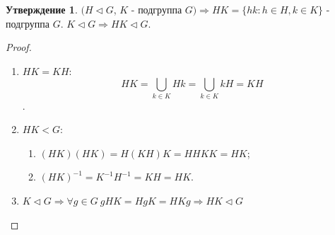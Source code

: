\documentclass[11pt,a4paper]{report}
\renewcommand{\implies}{\Rightarrow}
\newcommand{\tl}{\triangleleft}
\theoremstyle{definition}
\theoremstyle{definition}
\newtheorem{preposition}{Утверждение}[section]
\theoremstyle{definition}
\begin{document}
\begin{preposition}
  \label{normal_and_sub_prep}
  $(H \tl G$, $K$ - подгруппа $G) \implies HK = \{ hk : h \in H, k \in K \}$ - подгруппа $G$. $K \tl G \implies HK \tl G$.
\begin{proof}
\begin{enumerate}
\item{$HK = KH$:$$HK = \bigcup_{k \in K} Hk =
  \bigcup_{k \in K} kH = KH$$.}
  \item{$HK < G$:}
  \begin{enumerate}
  \item{$(HK)(HK) = H(KH)K = HH KK = HK$;}
  \item{ $(HK)^{-1} = K^{-1}H^{-1} = KH = HK$.}
  \end{enumerate}
  \item{$K \tl G\implies \forall{g \in G}~gHK = HgK = HKg \implies HK \tl G$}
\end{enumerate}
\end{proof}
\end{preposition}

 	
 	
\end{document}
